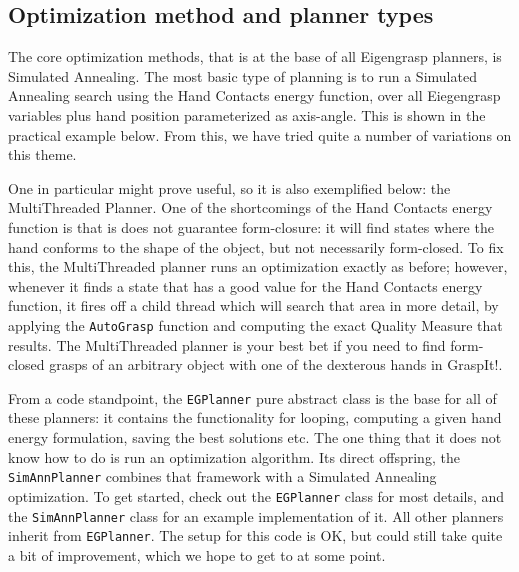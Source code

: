 \subsection{Optimization method and planner types}

The core optimization methods, that is at the base of all Eigengrasp
planners, is Simulated Annealing. The most basic type of planning is
to run a Simulated Annealing search using the Hand Contacts energy
function, over all Eiegengrasp variables plus hand position
parameterized as axis-angle. This is shown in the practical example
below. From this, we have tried quite a number of variations on this
theme.

One in particular might prove useful, so it is also exemplified below:
the MultiThreaded Planner. One of the shortcomings of the Hand
Contacts energy function is that is does not guarantee form-closure:
it will find states where the hand conforms to the shape of the
object, but not necessarily form-closed. To fix this, the
MultiThreaded planner runs an optimization exactly as before; however,
whenever it finds a state that has a good value for the Hand Contacts
energy function, it fires off a child thread which will search that
area in more detail, by applying the \texttt{AutoGrasp} function and
computing the exact Quality Measure that results. The MultiThreaded
planner is your best bet if you need to find form-closed grasps of an
arbitrary object with one of the dexterous hands in GraspIt!.

From a code standpoint, the \texttt{EGPlanner} pure abstract class is
the base for all of these planners: it contains the functionality for
looping, computing a given hand energy formulation, saving the best
solutions etc. The one thing that it does not know how to do is run an
optimization algorithm. Its direct offspring, the
\texttt{SimAnnPlanner} combines that framework with a Simulated
Annealing optimization. To get started, check out the
\texttt{EGPlanner} class for most details, and the
\texttt{SimAnnPlanner} class for an example implementation of it. All
other planners inherit from \texttt{EGPlanner}. The setup for this
code is OK, but could still take quite a bit of improvement, which we
hope to get to at some point.

